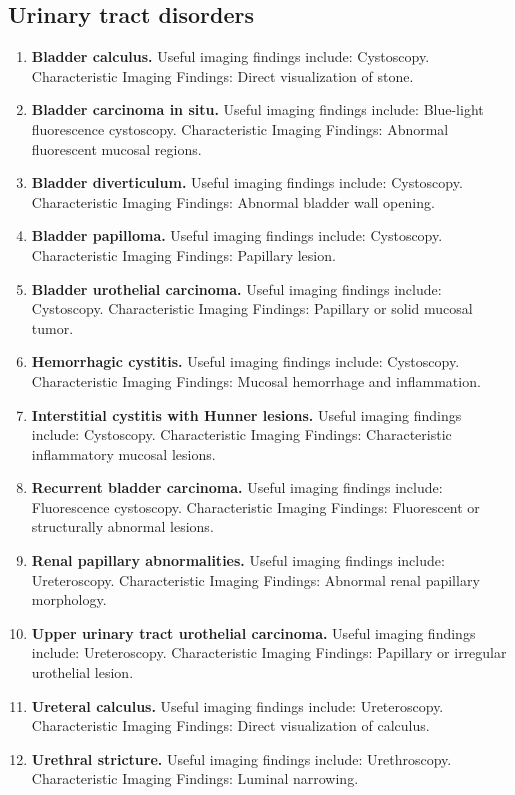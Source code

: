 \subsection{Urinary tract disorders}
\begin{enumerate}[leftmargin=*,itemsep=0.45em,topsep=0.4em]
\item \textbf{Bladder calculus.} Useful imaging findings include: Cystoscopy. Characteristic Imaging Findings: Direct visualization of stone.
\item \textbf{Bladder carcinoma in situ.} Useful imaging findings include: Blue-light fluorescence cystoscopy. Characteristic Imaging Findings: Abnormal fluorescent mucosal regions.
\item \textbf{Bladder diverticulum.} Useful imaging findings include: Cystoscopy. Characteristic Imaging Findings: Abnormal bladder wall opening.
\item \textbf{Bladder papilloma.} Useful imaging findings include: Cystoscopy. Characteristic Imaging Findings: Papillary lesion.
\item \textbf{Bladder urothelial carcinoma.} Useful imaging findings include: Cystoscopy. Characteristic Imaging Findings: Papillary or solid mucosal tumor.
\item \textbf{Hemorrhagic cystitis.} Useful imaging findings include: Cystoscopy. Characteristic Imaging Findings: Mucosal hemorrhage and inflammation.
\item \textbf{Interstitial cystitis with Hunner lesions.} Useful imaging findings include: Cystoscopy. Characteristic Imaging Findings: Characteristic inflammatory mucosal lesions.
\item \textbf{Recurrent bladder carcinoma.} Useful imaging findings include: Fluorescence cystoscopy. Characteristic Imaging Findings: Fluorescent or structurally abnormal lesions.
\item \textbf{Renal papillary abnormalities.} Useful imaging findings include: Ureteroscopy. Characteristic Imaging Findings: Abnormal renal papillary morphology.
\item \textbf{Upper urinary tract urothelial carcinoma.} Useful imaging findings include: Ureteroscopy. Characteristic Imaging Findings: Papillary or irregular urothelial lesion.
\item \textbf{Ureteral calculus.} Useful imaging findings include: Ureteroscopy. Characteristic Imaging Findings: Direct visualization of calculus.
\item \textbf{Urethral stricture.} Useful imaging findings include: Urethroscopy. Characteristic Imaging Findings: Luminal narrowing.
\end{enumerate}

